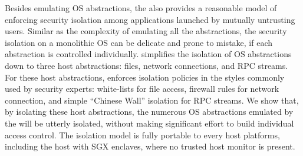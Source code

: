 Besides emulating OS abstractions, the \graphene{} \libos{} also provides a reasonable model of enforcing security isolation among applications launched by mutually untrusting users.
Similar as the complexity of emulating all the abstractions,
the security isolation on a monolithic OS can be delicate and prone to mistake,
if each abstraction is controlled individually.
\graphene{} simplifies the isolation of OS abstractions
down to three host abstractions: files, network connections, and RPC streams.
For these host abstractions, \graphene{} enforces isolation policies in the styles
commonly used by security experts:
white-lists for file access, firewall rules for network connection,
and simple ``Chinese Wall'' isolation for RPC streams.
We show that, by isolating these host abstractions,
the numerous OS abstractions emulated by the \liboses{} will be utterly isolated,
without making significant effort to build individual access control.
The isolation model is fully portable to every host platforms,
including the host with SGX enclaves, where no trusted host monitor is present.



